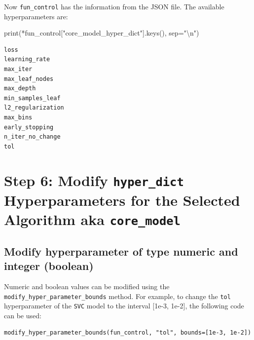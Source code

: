 \documentclass[
  letterpaper,
  DIV=11,
  numbers=noendperiod]{scrreprt}
\newenvironment{Shaded}{\begin{snugshade}}{\end{snugshade}}
\newcommand{\BuiltInTok}[1]{\textcolor[rgb]{0.00,0.23,0.31}{#1}}
\newcommand{\CharTok}[1]{\textcolor[rgb]{0.13,0.47,0.30}{#1}}
\newcommand{\NormalTok}[1]{\textcolor[rgb]{0.00,0.23,0.31}{#1}}
\newcommand{\OperatorTok}[1]{\textcolor[rgb]{0.37,0.37,0.37}{#1}}
\newcommand{\StringTok}[1]{\textcolor[rgb]{0.13,0.47,0.30}{#1}}
\begin{document}
Now \texttt{fun\_control} has the information from the JSON file. The
available hyperparameters are:

\begin{Shaded}
\begin{Highlighting}[]
\BuiltInTok{print}\NormalTok{(}\OperatorTok{*}\NormalTok{fun\_control[}\StringTok{"core\_model\_hyper\_dict"}\NormalTok{].keys(), sep}\OperatorTok{=}\StringTok{"}\CharTok{\textbackslash{}n}\StringTok{"}\NormalTok{)}
\end{Highlighting}
\end{Shaded}

\begin{verbatim}
loss
learning_rate
max_iter
max_leaf_nodes
max_depth
min_samples_leaf
l2_regularization
max_bins
early_stopping
n_iter_no_change
tol
\end{verbatim}

\hypertarget{step-6-modify-hyper_dict-hyperparameters-for-the-selected-algorithm-aka-core_model-2}{%
\section{\texorpdfstring{Step 6: Modify \texttt{hyper\_dict}
Hyperparameters for the Selected Algorithm aka
\texttt{core\_model}}{Step 6: Modify hyper\_dict Hyperparameters for the Selected Algorithm aka core\_model}}\label{step-6-modify-hyper_dict-hyperparameters-for-the-selected-algorithm-aka-core_model-2}}

\hypertarget{modify-hyperparameter-of-type-numeric-and-integer-boolean-2}{%
\subsection{Modify hyperparameter of type numeric and integer
(boolean)}\label{modify-hyperparameter-of-type-numeric-and-integer-boolean-2}}

Numeric and boolean values can be modified using the
\texttt{modify\_hyper\_parameter\_bounds} method. For example, to change
the \texttt{tol} hyperparameter of the \texttt{SVC} model to the
interval {[}1e-3, 1e-2{]}, the following code can be used:

\texttt{modify\_hyper\_parameter\_bounds(fun\_control,\ "tol",\ bounds={[}1e-3,\ 1e-2{]})}
\end{document}
